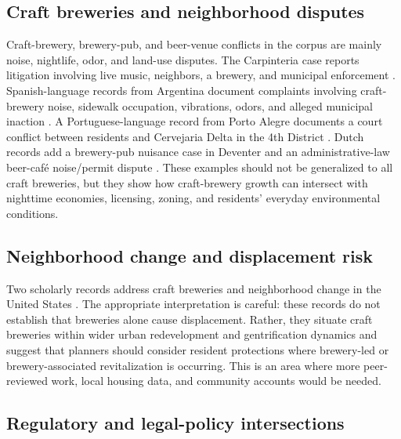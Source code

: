\documentclass[man,12pt]{apa7}
\begin{document}
\subsection{Craft breweries and neighborhood disputes}

Craft-brewery, brewery-pub, and beer-venue conflicts in the corpus are mainly noise, nightlife, odor, and land-use disputes. The Carpinteria case reports litigation involving live music, neighbors, a brewery, and municipal enforcement \cite{NEWS_2025_US_island-brewing-noise_N003}. Spanish-language records from Argentina document complaints involving craft-brewery noise, sidewalk occupation, vibrations, odors, and alleged municipal inaction \cite{NEWS_2024_AR_ogham-bariloche-noise_N006,NEWS_2017_AR_boom-cervecerias-ruidos_N007}. A Portuguese-language record from Porto Alegre documents a court conflict between residents and Cervejaria Delta in the 4th District \cite{NEWS_2022_BR_delta-porto-alegre-noise_N008}. Dutch records add a brewery-pub nuisance case in Deventer and an administrative-law beer-caf\'e noise/permit dispute \cite{NEWS_2019_NL_davo-brouwerij-overlast_N010,LEGAL_2021_NL_biercafe-geluidsoverlast_L001}. These examples should not be generalized to all craft breweries, but they show how craft-brewery growth can intersect with nighttime economies, licensing, zoning, and residents' everyday environmental conditions.

\subsection{Neighborhood change and displacement risk}

Two scholarly records address craft breweries and neighborhood change in the United States \cite{ARTICLE_2017_US_neighborhood-change-pint_A001,ARTICLE_2018_US_craft-breweries-local-characteristics_A002}. The appropriate interpretation is careful: these records do not establish that breweries alone cause displacement. Rather, they situate craft breweries within wider urban redevelopment and gentrification dynamics and suggest that planners should consider resident protections where brewery-led or brewery-associated revitalization is occurring. This is an area where more peer-reviewed work, local housing data, and community accounts would be needed.

\subsection{Regulatory and legal-policy intersections}
\end{document}
